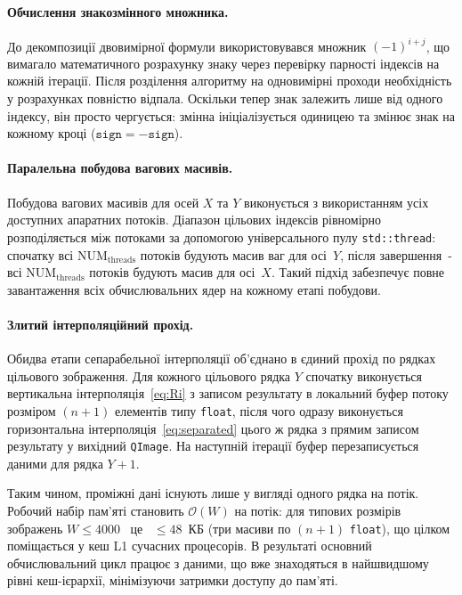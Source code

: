 \paragraph{Обчислення знакозмінного множника.}
До декомпозиції двовимірної формули використовувався множник $(-1)^{i+j}$, що вимагало математичного розрахунку знаку через перевірку парності індексів на кожній ітерації. Після розділення алгоритму на одновимірні проходи необхідність у розрахунках повністю відпала. Оскільки тепер знак залежить лише від одного індексу, він просто чергується: змінна ініціалізується одиницею та змінює знак на кожному кроці ($\texttt{sign} = -\texttt{sign}$).

\paragraph{Паралельна побудова вагових масивів.}
Побудова вагових масивів для осей $X$ та $Y$ виконується з використанням
усіх доступних апаратних потоків. Діапазон цільових індексів рівномірно
розподіляється між потоками за допомогою універсального пулу
\texttt{std::thread}: спочатку всі $\text{NUM}_\text{threads}$ потоків будують
масив ваг для осі~$Y$, після завершення~- всі $\text{NUM}_\text{threads}$
потоків будують масив для осі~$X$. Такий підхід забезпечує повне
завантаження всіх обчислювальних ядер на кожному етапі побудови.

\paragraph{Злитий інтерполяційний прохід.}
Обидва етапи сепарабельної інтерполяції об'єднано в єдиний прохід по
рядках цільового зображення. Для кожного цільового рядка $Y$ спочатку
виконується вертикальна інтерполяція~\eqref{eq:Ri} з записом результату
в локальний буфер потоку розміром $(n+1)$ елементів типу \texttt{float}, після чого одразу виконується горизонтальна
інтерполяція~\eqref{eq:separated} цього ж рядка з прямим записом
результату у вихідний \texttt{QImage}. На наступній ітерації буфер
перезаписується даними для рядка $Y+1$.

Таким чином, проміжні дані існують лише у вигляді одного рядка на потік. Робочий набір пам'яті
становить $\mathcal{O}(W)$ на потік: для типових розмірів зображень
$W \leq 4000$ ~це ~$\leq 48$~КБ (три масиви по $(n+1)$ \texttt{float}),
що цілком поміщається у кеш L1 сучасних процесорів. В результаті основний обчислювальний цикл працює з даними,
що вже знаходяться в найшвидшому рівні кеш-ієрархії, мінімізуючи
затримки доступу до пам'яті.

